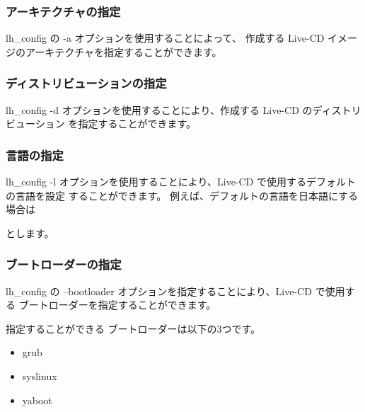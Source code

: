 \documentclass[mingoth,a4paper]{jsarticle}
\begin{document}
\subsubsection{アーキテクチャの指定}

lh\_config の -a オプションを使用することによって、
作成する Live-CD イメージのアーキテクチャを指定することができます。

\begin{commandline}
\end{commandline}

\subsubsection{ディストリビューションの指定}
lh\_config -d オプションを使用することにより、作成する Live-CD のディストリビューション
を指定することができます。

\begin{commandline}
\end{commandline}

\subsubsection{言語の指定}
lh\_config -l オプションを使用することにより、Live-CD で使用するデフォルトの言語を設定
することができます。
例えば、デフォルトの言語を日本語にする場合は
\begin{commandline}
\end{commandline}
とします。

\subsubsection{ブートローダーの指定}
lh\_config の --bootloader オプションを指定することにより、Live-CD で使用する
ブートローダーを指定することができます。

\begin{commandline}
\end{commandline}

指定することができる ブートローダーは以下の3つです。
\begin{itemize}
\item grub
\item syslinux
\item yaboot
\end{itemize}
\end{document}
